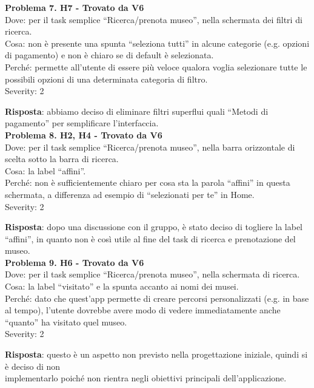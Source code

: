 \documentclass{article}
\begin{document}
\noindent \textbf{Problema 7. H7 - Trovato da V6} \\
Dove: per il task semplice “Ricerca/prenota museo”, nella schermata dei filtri di ricerca. \\
Cosa: non è presente una spunta “seleziona tutti” in alcune categorie (e.g. opzioni di pagamento) e non è chiaro se di default è selezionata. \\
Perché: permette all’utente di essere più veloce qualora voglia selezionare tutte le possibili opzioni di una determinata categoria di filtro. \\
Severity: 2

\noindent \textbf{Risposta}: abbiamo deciso di eliminare filtri superflui quali “Metodi di pagamento” per semplificare l’interfaccia.\\

\noindent \textbf{Problema 8. H2, H4 - Trovato da V6} \\
Dove: per il task semplice “Ricerca/prenota museo”, nella barra orizzontale di scelta sotto la barra di ricerca. \\
Cosa: la label “affini”. \\
Perché: non è sufficientemente chiaro per cosa sta la parola “affini” in questa schermata, a differenza ad esempio di “selezionati per te” in Home. \\
Severity: 2

\noindent \textbf{Risposta}: dopo una discussione con il gruppo, è stato deciso di togliere la label “affini”, in quanto non è così utile al fine del task di ricerca e prenotazione del museo.\\

\noindent \textbf{Problema 9. H6 - Trovato da V6} \\
Dove: per il task semplice “Ricerca/prenota museo”, nella schermata di ricerca. \\
Cosa: la label “visitato” e la spunta accanto ai nomi dei musei. \\
Perché: dato che quest’app permette di creare percorsi personalizzati (e.g. in base al tempo), l’utente dovrebbe avere modo di vedere immediatamente anche “quanto” ha visitato quel museo. \\
Severity: 2

\noindent \textbf{Risposta}: questo è un aspetto non previsto nella progettazione iniziale, quindi si è deciso di non \\ implementarlo poiché non rientra negli obiettivi principali dell’applicazione.\\
\end{document}
